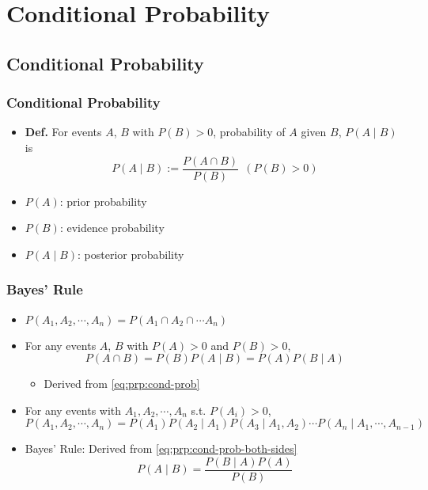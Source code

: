 \section{Conditional Probability}

\subsection{Conditional Probability}

\subsubsection*{Conditional Probability}
\begin{itemize}
    \item \textbf{Def.} For events $A$, $B$ with $P(B)>0$, probability of $A$ given $B$, $P(A\mid B)$ is
    \begin{equation}\label{eq:prp:cond-prob}
        P(A\mid B):=\frac{P(A\cap B)}{P(B)}~~(P(B)>0)
    \end{equation}
    \item $P(A)$: prior probability
    \item $P(B)$: evidence probability
    \item $P(A\mid B)$: posterior probability
\end{itemize}

\subsubsection*{Bayes' Rule}
\begin{itemize}
    \item $P(A_1,A_2,\cdots,A_n)=P(A_1\cap A_2\cap\cdots A_n)$
    \item For any events $A$, $B$ with $P(A)>0$ and $P(B)>0$,
    \begin{equation}\label{eq:prp:cond-prob-both-sides}
        P(A\cap B)=P(B)P(A\mid B)=P(A)P(B\mid A)
    \end{equation}
    \begin{itemize}
        \item Derived from \ref{eq:prp:cond-prob}
    \end{itemize}
    \item For any events with $A_1,A_2,\cdots,A_n$ s.t. $P(A_i)>0$,
    \begin{equation}
        P(A_1,A_2,\cdots,A_n)=P(A_1)P(A_2\mid A_1)P(A_3\mid A_1,A_2)\cdots P(A_n\mid A_1,\cdots,A_{n-1})
    \end{equation}
    \item Bayes' Rule: Derived from \ref{eq:prp:cond-prob-both-sides}
    \begin{equation}\label{eq:prp:bayes-rule}
        P(A\mid B)=\frac{P(B\mid A)P(A)}{P(B)}
    \end{equation}
\end{itemize}

